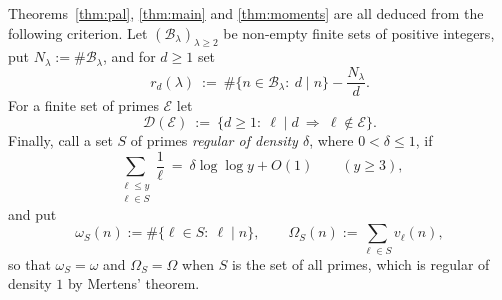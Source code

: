 \documentclass[11pt,a4paper]{article}
\theoremstyle{plain}
\theoremstyle{definition}
\numberwithin{equation}{section}
\begin{document}
Theorems~\ref{thm:pal}, \ref{thm:main} and \ref{thm:moments} are all deduced from the following
criterion. Let $(\mathcal B_\lambda)_{\lambda\ge2}$ be
non-empty finite sets of positive integers, put $N_\lambda:=\#\mathcal B_\lambda$, and for $d\ge1$ set
\begin{equation}\label{eq:defr}
r_d(\lambda)\ :=\ \#\bigl\{n\in\mathcal B_\lambda:\ d\mid n\bigr\}-\frac{N_\lambda}{d}.
\end{equation}
For a finite set of primes $\mathcal E$ let
\begin{equation}\label{eq:defD}
\mathcal D(\mathcal E)\ :=\ \bigl\{d\ge1:\ \ell\mid d\ \Rightarrow\ \ell\notin\mathcal E\bigr\}.
\end{equation}
Finally, call a set $S$ of primes \emph{regular of density $\delta$}, where $0<\delta\le1$, if
\begin{equation}\label{eq:regular}
\sum_{\substack{\ell\le y\\ \ell\in S}}\frac1\ell\ =\ \delta\log\log y+O(1)\qquad(y\ge3),
\end{equation}
and put
\[
\omega_S(n):=\#\{\ell\in S:\ \ell\mid n\},\qquad \Omega_S(n):=\sum_{\ell\in S}v_\ell(n),
\]
so that $\omega_S=\omega$ and $\Omega_S=\Omega$ when $S$ is the set of all primes, which is regular of
density $1$ by Mertens' theorem.
\end{document}
